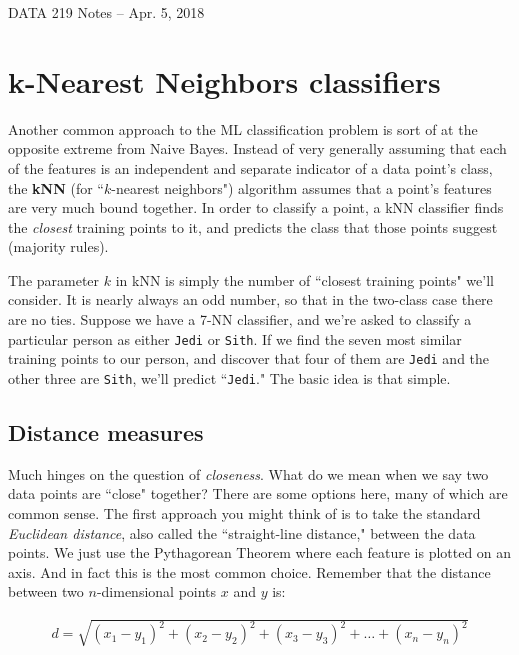 \documentclass[12pt]{article}
\begin{document}
\begin{center}
\begin{Large}
DATA 219 Notes -- Apr. 5, 2018
\end{Large}
\end{center}

\section{k-Nearest Neighbors classifiers}

Another common approach to the ML classification problem is sort of at the
opposite extreme from Naive Bayes. Instead of very generally assuming that
each of the features is an independent and separate indicator of a data
point's class, the \textbf{kNN} (for ``$k$-nearest neighbors") algorithm
assumes that a point's features are very much bound together. In order to
classify a point, a kNN classifier finds the \textit{closest} training points
to it, and predicts the class that those points suggest (majority rules).

The parameter $k$ in kNN is simply the number of ``closest training points"
we'll consider. It is nearly always an odd number, so that in the two-class
case there are no ties. Suppose we have a 7-NN classifier, and we're asked to
classify a particular person as either \texttt{Jedi} or \texttt{Sith}. If we
find the seven most similar training points to our person, and discover that
four of them are \texttt{Jedi} and the other three are \texttt{Sith}, we'll
predict ``\texttt{Jedi}." The basic idea is that simple.

\subsection{Distance measures}

Much hinges on the question of \textit{closeness}. What do we mean when we say
two data points are ``close" together? There are some options here, many of
which are common sense. The first approach you might think of is to take the
standard \textit{Euclidean distance}, also called the ``straight-line
distance," between the data points. We just use the Pythagorean Theorem where
each feature is plotted on an axis. And in fact this is the most common
choice. Remember that the distance between two $n$-dimensional points $x$ and
$y$ is:

\begin{align*}
d = \sqrt{(x_1-y_1)^2 + (x_2-y_2)^2 + (x_3-y_3)^2 + \dots + (x_n-y_n)^2}
\end{align*}
\end{document}
